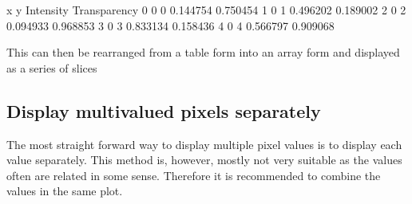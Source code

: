 \documentclass[letterpaper,10pt,english]{sphinxmanual}
\begin{document}
\begin{sphinxVerbatim}[commandchars=\\\{\}]
  \PYG{p}{[}          \PYG{p}{]}
\PYG{p}{[}\PYG{p}{]}    
\PYG{p}{[}\PYG{p}{]}    
\end{sphinxVerbatim}

\begin{sphinxVerbatim}[commandchars=\\\{\}]
   x  y  Intensity  Transparency
0  0  0   0.144754      0.750454
1  0  1   0.496202      0.189002
2  0  2   0.094933      0.968853
3  0  3   0.833134      0.158436
4  0  4   0.566797      0.909068
\end{sphinxVerbatim}

\sphinxAtStartPar
This can then be rearranged from a table form into an array form and displayed as a series of slices


\subsection{Display multi\sphinxhyphen{}valued pixels separately}
\label{\detokenize{01-Introduction:display-multi-valued-pixels-separately}}
\sphinxAtStartPar
The most straight forward way to display multiple pixel values is to display each value separately. This method is, however, mostly not very suitable as the values often are related in some sense. Therefore it is recommended to combine the values in the same plot.
\end{document}
